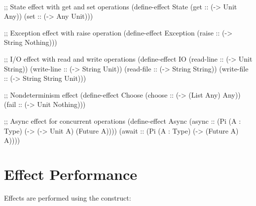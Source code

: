 \begin{grammar}
\\
\end{grammar}

\begin{example}
\begin{lambdustcode}
;; State effect with get and set operations
(define-effect State
  (get :: (-> Unit Any))
  (set :: (-> Any Unit)))

;; Exception effect with raise operation  
(define-effect Exception
  (raise :: (-> String Nothing)))

;; I/O effect with read and write operations
(define-effect IO
  (read-line :: (-> Unit String))
  (write-line :: (-> String Unit))
  (read-file :: (-> String String)) 
  (write-file :: (-> String String Unit)))

;; Nondeterminism effect
(define-effect Choose
  (choose :: (-> (List Any) Any))
  (fail :: (-> Unit Nothing)))

;; Async effect for concurrent operations
(define-effect Async  
  (async :: (Pi (A : Type) (-> (-> Unit A) (Future A))))
  (await :: (Pi (A : Type) (-> (Future A) A))))
\end{lambdustcode}
\end{example}

\section{Effect Performance}
\label{sec:effect-performance}


Effects are performed using the  construct:

\begin{grammar}
\end{grammar}

